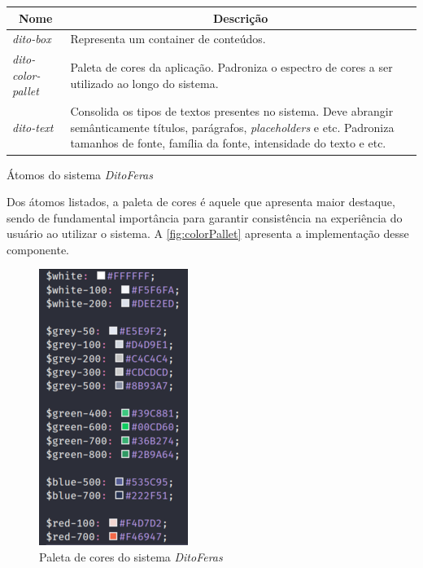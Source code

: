 \begin{quadro}
\centering
\begin{tabular}{|m{4cm}|m{10cm}|} \hline
	
	\multicolumn{1}{|c|}{\bfseries Nome} & \multicolumn{1}{c|}{\bfseries Descrição} \\\hline
	
	 \textit{dito-box} &  Representa um container de conteúdos. \\\hline
	 
	 \textit{dito-color-pallet} & Paleta de cores da aplicação. Padroniza o espectro de cores a ser utilizado ao longo do sistema. \\\hline
	 
	 \textit{dito-text} & Consolida os tipos de textos presentes no sistema. Deve abrangir semânticamente títulos, parágrafos, \textit{placeholders} e etc. Padroniza tamanhos de fonte, família da fonte, intensidade do texto e etc. \\\hline
    
\end{tabular}
\caption{Átomos do sistema \textit{DitoFeras}}
\label{table:atomsDitoFeras}
\end{quadro}

Dos átomos listados, a paleta de cores é aquele que apresenta maior destaque, sendo de fundamental importância para garantir consistência na experiência do usuário ao utilizar o sistema. A \autoref{fig:colorPallet} apresenta a implementação desse componente.

\begin{figure}
  \begin{center}
	  \includegraphics[]{./04-figuras/06_biblioteca_componentes/color-pallet.png}
	\end{center}
  \caption{Paleta de cores do sistema \textit{DitoFeras}}
  \label{fig:colorPallet}
\end{figure}


